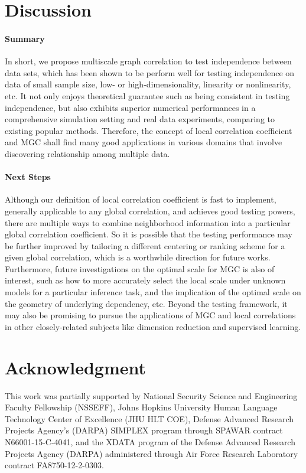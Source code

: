 \documentclass[11pt]{article}
\begin{document}
\section{Discussion}
\label{conclu}

\paragraph{Summary}
In short, we propose multiscale graph correlation to test independence between data sets, which has been shown to be perform well for testing independence on data of small sample size, low- or high-dimensionality, linearity or nonlinearity, etc. It not only enjoys theoretical guarantee such as being consistent in testing independence, but also exhibits superior numerical performances in a comprehensive simulation setting and real data experiments, comparing to existing popular methods. Therefore, the concept of local correlation coefficient and MGC shall find many good applications in various domains that involve discovering relationship among multiple data. 

\paragraph{Next Steps}
Although our definition of local correlation coefficient is fast to implement, generally applicable to any global correlation, and achieves good testing powers, there are multiple ways to combine neighborhood information into a particular global correlation coefficient. So it is possible that the testing performance may be further improved by tailoring a different centering or ranking scheme for a given global correlation, which is a worthwhile direction for future works. Furthermore, future investigations on the optimal scale for MGC is also of interest, such as how to more accurately select the local scale under unknown models for a particular inference task, and the implication of the optimal scale on the geometry of underlying dependency, etc. Beyond the testing framework, it may also be promising to pursue the applications of MGC and local correlations in other closely-related subjects like dimension reduction and supervised learning. 


\section*{Acknowledgment}
This work was partially supported by 
% 
National Security Science and Engineering Faculty Fellowship (NSSEFF), 
% 
Johns Hopkins University Human Language Technology Center of Excellence (JHU HLT COE), 
% 
Defense Advanced Research Projects Agency's (DARPA) SIMPLEX program through SPAWAR contract N66001-15-C-4041, 
% 
and the XDATA program of the Defense Advanced Research Projects Agency (DARPA) administered through Air Force Research Laboratory contract FA8750-12-2-0303.
\end{document}
